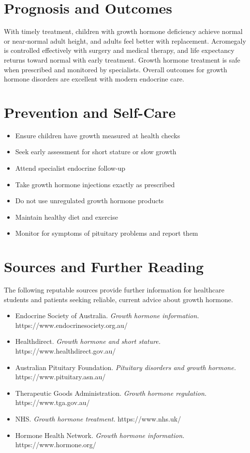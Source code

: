 \section*{Prognosis and Outcomes}
With timely treatment, children with growth hormone deficiency achieve normal or near-normal adult height, and adults feel better with replacement. Acromegaly is controlled effectively with surgery and medical therapy, and life expectancy returns toward normal with early treatment. Growth hormone treatment is safe when prescribed and monitored by specialists. Overall outcomes for growth hormone disorders are excellent with modern endocrine care.

\section*{Prevention and Self-Care}
\begin{itemize}
    \item Ensure children have growth measured at health checks
    \item Seek early assessment for short stature or slow growth
    \item Attend specialist endocrine follow-up
    \item Take growth hormone injections exactly as prescribed
    \item Do not use unregulated growth hormone products
    \item Maintain healthy diet and exercise
    \item Monitor for symptoms of pituitary problems and report them
\end{itemize}

\section*{Sources and Further Reading}
The following reputable sources provide further information for healthcare students and patients seeking reliable, current advice about growth hormone.

\begin{itemize}
    \item Endocrine Society of Australia. \textit{Growth hormone information.} https://www.endocrinesociety.org.au/
    \item Healthdirect. \textit{Growth hormone and short stature.} https://www.healthdirect.gov.au/
    \item Australian Pituitary Foundation. \textit{Pituitary disorders and growth hormone.} https://www.pituitary.asn.au/
    \item Therapeutic Goods Administration. \textit{Growth hormone regulation.} https://www.tga.gov.au/
    \item NHS. \textit{Growth hormone treatment.} https://www.nhs.uk/
    \item Hormone Health Network. \textit{Growth hormone information.} https://www.hormone.org/
\end{itemize}
